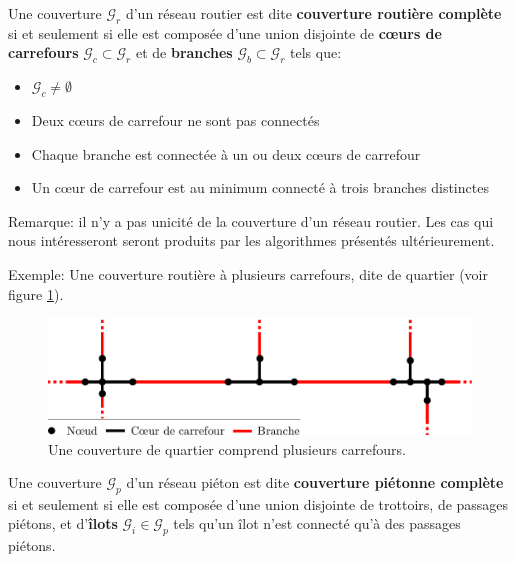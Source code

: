 \begin{definition}
    Une couverture $\mathcal{G}_r$ d'un réseau routier est dite \textbf{couverture routière complète} si et seulement si elle est composée d'une union disjointe de \textbf{cœurs de carrefours} $\mathcal{G}_c \subset \mathcal{G}_r$ et de \textbf{branches} $\mathcal{G}_b \subset \mathcal{G}_r$ tels que:

    \begin{itemize}
        \item $\mathcal{G}_c \neq \emptyset$ 
        \item Deux cœurs de carrefour ne sont pas connectés
        \item Chaque branche est connectée à un ou deux cœurs de carrefour
        \item Un cœur de carrefour est au minimum connecté à trois branches distinctes
    \end{itemize}
    \label{def:modelisation_couverture_routiere_complète}
\end{definition}

\noindent
Remarque: il n'y a pas unicité de la couverture d'un réseau routier. Les cas qui nous intéresseront seront produits par les algorithmes présentés ultérieurement.

\newpar{}

\noindent
Exemple: Une couverture routière à plusieurs carrefours, dite de quartier (voir figure \ref{fig:mod_ex_couverture_quartier}).

\begin{figure}[H]
    \centering
    \includegraphics[width=\textwidth]{images/modelisation/graphe/couverture_quartier.pdf}
    \caption[Couverture d'un quartier]{Une couverture de quartier comprend plusieurs carrefours.}
    \label{fig:mod_ex_couverture_quartier}
\end{figure}

\begin{definition}
    Une couverture $\mathcal{G}_p$ d'un réseau piéton est dite \textbf{couverture piétonne complète} si et seulement si elle est composée d'une union disjointe de trottoirs, de passages piétons, et d'\textbf{îlots} $\mathcal{G}_i \in \mathcal{G}_p$ tels qu'un îlot n'est connecté qu'à des passages piétons.
\end{definition}

